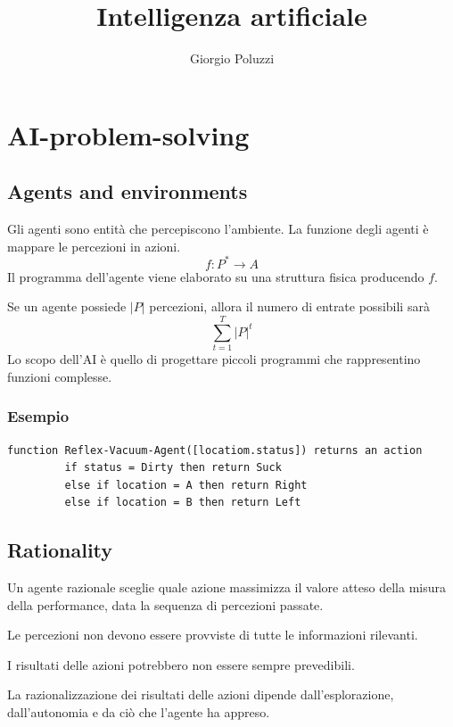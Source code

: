 \documentclass[12pt, a4paper]{article}
\begin{document}
\title{Intelligenza artificiale}
\author{Giorgio Poluzzi}
\maketitle

\section{AI-problem-solving}

\subsection{Agents and environments}

Gli agenti sono entità che percepiscono l'ambiente. La funzione degli agenti è mappare le percezioni in azioni.
$$
f:P^*\to A
$$
Il programma dell'agente viene elaborato su una struttura fisica producendo $f$.

Se un agente possiede $\left|P\right|$ percezioni, allora il numero di entrate possibili sarà
$$
\sum_{t=1}^T \left|P\right|^t
$$
Lo scopo dell'AI è quello di progettare piccoli programmi che rappresentino funzioni complesse.

\subsubsection*{Esempio}
\begin{lstlisting}
function Reflex-Vacuum-Agent([locatiom.status]) returns an action
         if status = Dirty then return Suck
         else if location = A then return Right
         else if location = B then return Left
\end{lstlisting}

\subsection{Rationality}
Un agente razionale sceglie quale azione massimizza il valore atteso della misura della performance, data la sequenza di percezioni passate.

Le percezioni non devono essere provviste di tutte le informazioni rilevanti.

I risultati delle azioni potrebbero non essere sempre prevedibili.

La razionalizzazione dei risultati delle azioni dipende dall'esplorazione, dall'autonomia e da ciò che l'agente ha appreso.
\end{document}
